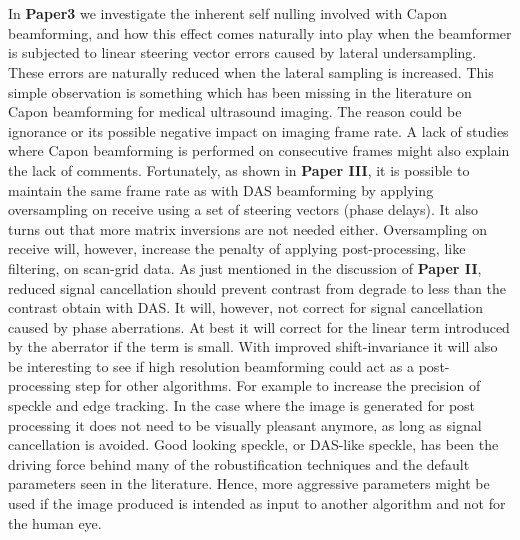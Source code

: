 \\\\
In \textbf{Paper3} we investigate the inherent self nulling involved with Capon beamforming, and how this effect comes naturally into play when the beamformer is subjected to linear steering vector errors caused by lateral undersampling. These errors are naturally reduced when the lateral sampling is increased. This simple observation is something which has been missing in the literature on Capon beamforming for medical ultrasound imaging. The reason could be ignorance or its possible negative impact on imaging frame rate. A lack of studies where Capon beamforming is performed on consecutive frames might also explain the lack of comments. Fortunately, as shown in \textbf{Paper III}, it is possible to maintain the same frame rate as with DAS beamforming by applying oversampling on receive using a set of steering vectors (phase delays). It also turns out that more matrix inversions are not needed either. Oversampling on receive will, however,  increase the penalty of applying post-processing, like filtering,  on scan-grid data. %
As just mentioned in the discussion of \textbf{Paper II}, reduced signal cancellation should prevent contrast from degrade to less than the contrast obtain with DAS. It will, however,  not correct for signal cancellation caused by phase aberrations. At best it will correct for the linear term introduced by the aberrator if the term is small.
With improved shift-invariance it will also be interesting to see if high resolution beamforming could act as a post-processing step for other algorithms. For example to increase the precision of speckle and edge tracking. In the case where the image is generated for post processing it does not need to be visually pleasant anymore, as long as signal cancellation is avoided. Good looking speckle, or DAS-like speckle, has been the driving force behind many of the robustification techniques and the default parameters seen in the literature. Hence, more aggressive parameters might be used if the image produced is intended as input to another algorithm and not for the human eye.
\\\\
